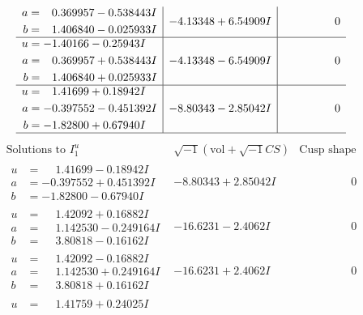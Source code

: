 \documentclass[1p]{elsarticle_modified}
\theoremstyle{definition}
\newcommand{\I}{\sqrt{-1}}
\begin{document}
$$\begin{array}{c|c|c}
\begin{aligned}
a &= \phantom{-}0.369957 - 0.538443 I \\
b &= \phantom{-}1.406840 - 0.025933 I\end{aligned}
 & -4.13348 + 6.54909 I & \phantom{-0.000000 } 0 \\ \hline\begin{aligned}
u &= -1.40166 - 0.25943 I \\
a &= \phantom{-}0.369957 + 0.538443 I \\
b &= \phantom{-}1.406840 + 0.025933 I\end{aligned}
 & -4.13348 - 6.54909 I & \phantom{-0.000000 } 0 \\ \hline\begin{aligned}
u &= \phantom{-}1.41699 + 0.18942 I \\
a &= -0.397552 - 0.451392 I \\
b &= -1.82800 + 0.67940 I\end{aligned}
 & -8.80343 - 2.85042 I & \phantom{-0.000000 } 0\\
 \hline 
 \end{array}$$\newpage$$\begin{array}{c|c|c}  
\text{Solutions to }I^u_{1}& \I (\text{vol} + \sqrt{-1}CS) & \text{Cusp shape}\\
 \hline 
\begin{aligned}
u &= \phantom{-}1.41699 - 0.18942 I \\
a &= -0.397552 + 0.451392 I \\
b &= -1.82800 - 0.67940 I\end{aligned}
 & -8.80343 + 2.85042 I & \phantom{-0.000000 } 0 \\ \hline\begin{aligned}
u &= \phantom{-}1.42092 + 0.16882 I \\
a &= \phantom{-}1.142530 - 0.249164 I \\
b &= \phantom{-}3.80818 - 0.16162 I\end{aligned}
 & -16.6231 - 2.4062 I & \phantom{-0.000000 } 0 \\ \hline\begin{aligned}
u &= \phantom{-}1.42092 - 0.16882 I \\
a &= \phantom{-}1.142530 + 0.249164 I \\
b &= \phantom{-}3.80818 + 0.16162 I\end{aligned}
 & -16.6231 + 2.4062 I & \phantom{-0.000000 } 0 \\ \hline\begin{aligned}
u &= \phantom{-}1.41759 + 0.24025 I \\

\end{aligned}
\end{array}$$
\end{document}

